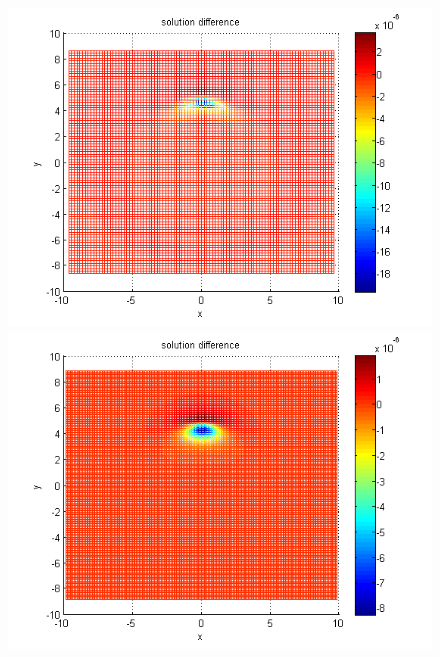 \documentclass{article}
\theoremstyle{remark}
\begin{document}
\begin{figure}[ht]\vspace{0.4cm}
	\begin{minipage}[b]{0.32\linewidth}
		 \includegraphics[width=\linewidth]{../amitans/figures/compare_30_bt3_c045_h020.png}
	\end{minipage}	
	\begin{minipage}[b]{0.32\linewidth}
		\includegraphics[width=\linewidth]{../amitans/figures/compare_30_bt3_c045_h010.png}
	\end{minipage}	
	\begin{minipage}[b]{0.32\linewidth}		

\end{minipage}
\end{figure}
\end{document}
